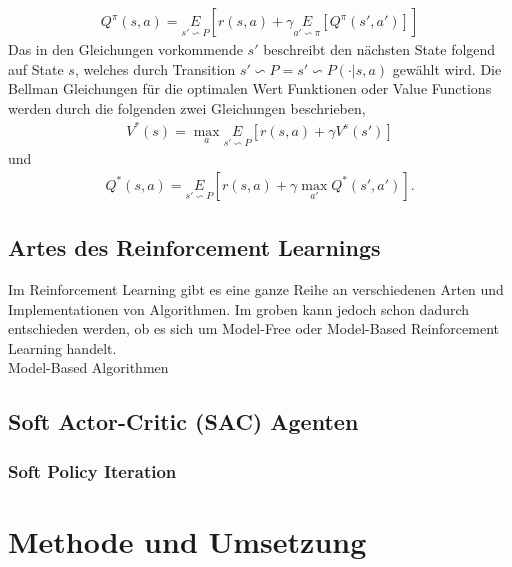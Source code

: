 \documentclass[]{iat}
\begin{document}
\begin{align}
    Q^{\pi}(s,a) = \underset{s' \backsim P}{E}\left[r(s,a)+\gamma \underset{a' \backsim \pi}{E}\left[Q^{\pi}(s',a')\right] \right] \label{eq:bellman_q_on_policy}
\end{align}
Das in den Gleichungen vorkommende $s'$ beschreibt den nächsten State folgend auf State $s$, welches durch Transition $s' \backsim P = s' \backsim P(\cdot |s,a)$ gewählt wird. Die Bellman Gleichungen für die optimalen Wert Funktionen oder Value Functions werden durch die folgenden zwei Gleichungen beschrieben,
\begin{align}
    V^*(s) = \max_a \underset{s'\backsim P}{E}\left[r(s,a)+\gamma V^s(s')\right] \label{eq:bellman_opv_on_policy}
\end{align}
und
\begin{align}
    Q^*(s,a) = \underset{s' \backsim P}{E}\left[r(s,a)+\gamma \max_{a'}Q^*(s', a')\right]. \label{eq:bellman_opq_on_policy}
\end{align}

\section{Artes des Reinforcement Learnings} \label{sec:arten_rf}
Im Reinforcement Learning gibt es eine ganze Reihe an verschiedenen Arten und Implementationen von Algorithmen. Im groben kann jedoch schon dadurch entschieden werden, ob es sich um Model-Free oder Model-Based Reinforcement Learning handelt.\\
Model-Based Algorithmen
\section{Soft Actor-Critic (SAC) Agenten} \label{sec:howto_sac}
\subsection{Soft Policy Iteration} \label{sec:sac_soft_policy}
\chapter{Methode und Umsetzung} \label{sec:methode_umsetzung}
\end{document}
